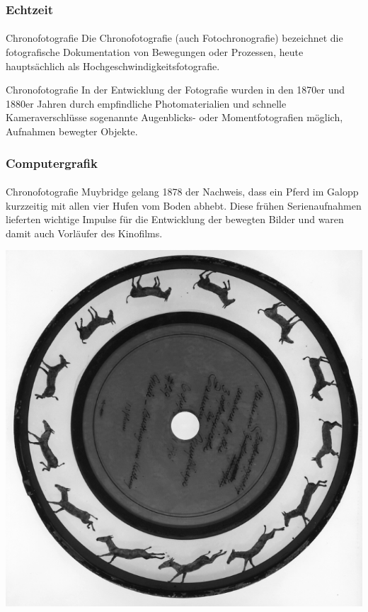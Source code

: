\documentclass{beamer}
\begin{document}
  \begin{frame}
    \frametitle{Echtzeit}
\framesubtitle{}
    \begin{block}{Chronofotografie}
        Die Chronofotografie (auch Fotochronografie) bezeichnet die fotografische Dokumentation von Bewegungen oder Prozessen, heute hauptsächlich als Hochgeschwindigkeitsfotografie. 
\end{block}

\begin{block}{Chronofotografie}
    In der Entwicklung der Fotografie wurden in den 1870er und 1880er Jahren durch empfindliche Photomaterialien und schnelle Kameraverschlüsse sogenannte Augenblicks- oder Momentfotografien möglich, Aufnahmen bewegter Objekte.
\end{block}
\end{frame}


\begin{frame}
    \frametitle{Computergrafik}
\framesubtitle{}
    \begin{block}{Chronofotografie}
        Muybridge gelang 1878 der Nachweis, dass ein Pferd im Galopp kurzzeitig mit allen vier Hufen vom Boden abhebt. Diese frühen Serienaufnahmen lieferten wichtige Impulse für die Entwicklung der bewegten Bilder und waren damit auch Vorläufer des Kinofilms. 
    \end{block}
    \begin{center}
        
        \includegraphics[scale=0.36]{images/Zoopraxiscope.jpg}
    \end{center}
   
\end{frame}
\end{document}
